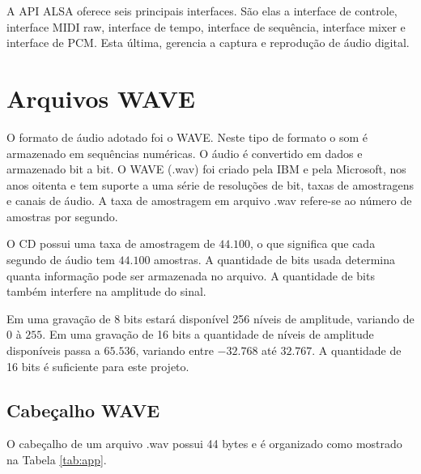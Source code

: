 \quad A API ALSA oferece seis principais interfaces. São elas  a interface de controle, interface MIDI raw, interface de tempo, interface de sequência, interface mixer e interface de PCM. Esta última, gerencia a captura e reprodução de áudio digital. 


\section{Arquivos WAVE}

\quad O formato de áudio adotado foi o WAVE. Neste tipo de formato o som é armazenado em sequências numéricas. O áudio é convertido em dados e armazenado bit a bit. O WAVE (.wav) foi criado pela IBM e pela Microsoft, nos anos oitenta e tem suporte a  uma série de resoluções de bit, taxas de amostragens e canais de áudio.  A taxa de amostragem em arquivo .wav refere-se ao número de amostras por segundo.

\quad O CD possui uma taxa de amostragem de $44.100$, o que significa que cada segundo de áudio tem $44.100$ amostras. A quantidade de bits usada determina  quanta informação pode ser armazenada  no arquivo. A quantidade de bits também interfere na amplitude do sinal.

\quad Em uma gravação de 8 bits estará disponível 256 níveis de amplitude, variando de $0$ à $255$. Em uma gravação de 16 bits a quantidade de níveis de amplitude disponíveis passa a $65.536$, variando entre $-32.768$  até $32.767$. A quantidade de 16 bits é suficiente para este projeto. 

\subsection{Cabeçalho WAVE}

\quad O cabeçalho de um arquivo .wav possui 44 bytes e é organizado como mostrado na Tabela \ref{tab:app}.

